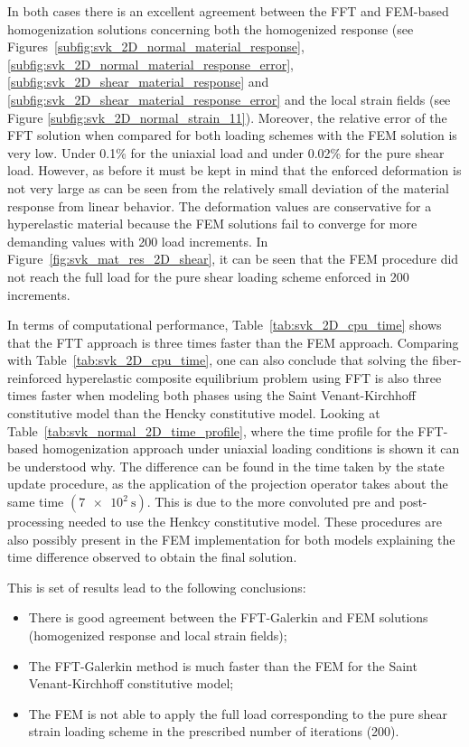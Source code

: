 In both cases there is an excellent agreement between the FFT and FEM-based homogenization solutions concerning both the homogenized response (see Figures~\ref{subfig:svk_2D_normal_material_response}, \ref{subfig:svk_2D_normal_material_response_error}, \ref{subfig:svk_2D_shear_material_response} and \ref{subfig:svk_2D_shear_material_response_error} and the local strain fields (see Figure \ref{subfig:svk_2D_normal_strain_11}).
Moreover, the relative error of the FFT solution when compared for both loading schemes with the FEM solution is very low.
Under 0.1\% for the uniaxial load and under 0.02\% for the pure shear load.
However, as before it must be kept in mind that the enforced deformation is not very large as can be seen from the relatively small deviation of the material response from linear behavior.
The deformation values are conservative for a hyperelastic material because the FEM solutions fail to converge for more demanding values with 200 load increments.
In Figure~\ref{fig:svk_mat_res_2D_shear}, it can be seen that the FEM procedure did not reach the full load for the pure shear loading scheme enforced in 200 increments.

In terms of computational performance, Table~\ref{tab:svk_2D_cpu_time} shows that the FTT approach is three times faster than the FEM approach.
Comparing with Table~\ref{tab:svk_2D_cpu_time}, one can also conclude that solving the fiber-reinforced hyperelastic composite equilibrium problem using FFT is also three times faster when modeling both phases using the Saint Venant-Kirchhoff constitutive model than the Hencky constitutive model.
Looking at Table~\ref{tab:svk_normal_2D_time_profile}, where the time profile for the FFT-based homogenization approach under uniaxial loading conditions is shown it can be understood why.
The difference can be found in the time taken by the state update procedure, as the application of the projection operator takes about the same time \((\SI{7e2}{\second})\).
This is due to the more convoluted pre and post-processing needed to use the Henkcy constitutive model.
These procedures are also possibly present in the FEM implementation for both models explaining the time difference observed to obtain the final solution.

This is set of results lead to the following conclusions:
\begin{itemize}
  \item There is good agreement between the FFT-Galerkin and FEM solutions (homogenized response and local strain fields);
  \item The FFT-Galerkin method is much faster than the FEM for the Saint Venant-Kirchhoff constitutive model;
  \item The FEM is not able to apply the full load corresponding to the pure shear strain loading scheme in the prescribed number of iterations (200).
\end{itemize}

